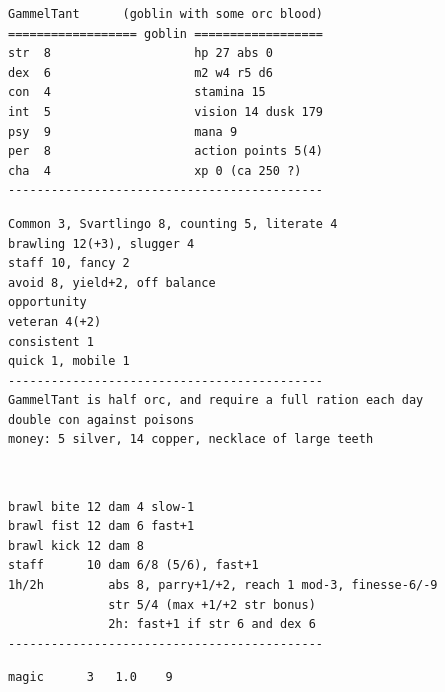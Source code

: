 \goodbreak \small \begin{samepage} \begin{verbatim}
GammelTant      (goblin with some orc blood)
================== goblin ==================
str  8                    hp 27 abs 0
dex  6                    m2 w4 r5 d6
con  4                    stamina 15
int  5                    vision 14 dusk 179
psy  9                    mana 9
per  8                    action points 5(4)
cha  4                    xp 0 (ca 250 ?)
--------------------------------------------
\end{verbatim} \end{samepage} \goodbreak \begin{samepage} \begin{verbatim}
Common 3, Svartlingo 8, counting 5, literate 4
brawling 12(+3), slugger 4
staff 10, fancy 2
avoid 8, yield+2, off balance     
opportunity
veteran 4(+2)
consistent 1      
quick 1, mobile 1
--------------------------------------------
GammelTant is half orc, and require a full ration each day
double con against poisons
money: 5 silver, 14 copper, necklace of large teeth
\end{verbatim} \end{samepage}   \   \goodbreak \begin{samepage} \begin{verbatim}
brawl bite 12 dam 4 slow-1
brawl fist 12 dam 6 fast+1
brawl kick 12 dam 8
staff      10 dam 6/8 (5/6), fast+1
1h/2h         abs 8, parry+1/+2, reach 1 mod-3, finesse-6/-9
              str 5/4 (max +1/+2 str bonus)
              2h: fast+1 if str 6 and dex 6
--------------------------------------------
\end{verbatim} \end{samepage} \goodbreak \begin{samepage} \begin{verbatim}
magic      3   1.0    9


\end{verbatim}
\end{samepage}
